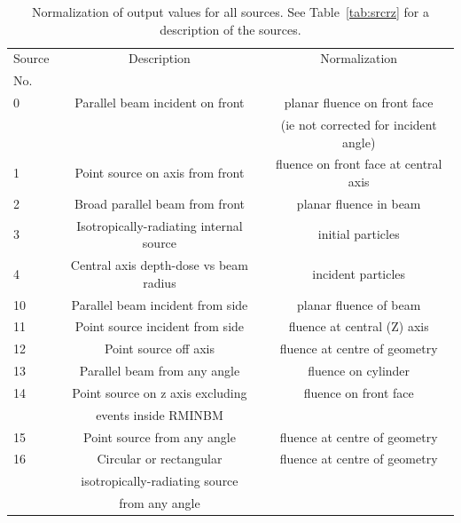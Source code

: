 \documentclass[12pt,twoside]{article}  %
\begin{document}
\begin{htmlonly}
\begin{table}[htb]
\begin{tabular}{|lcc|}
\caption[Normalization for all available sources.]
{Normalization of output values for all sources.  See Table~\ref{tab:srcrz}
for a description of the sources.}\\
\hline\hline
Source & Description & Normalization\\
No.  & & \\
\hline
0 & Parallel beam incident on front & planar fluence on front face \\
  &                                   & (ie not corrected for incident angle)\\
\hline
1 & Point source on axis from front & fluence on front face at central axis\\
\hline
2 & Broad parallel beam from front & planar fluence in beam\\
\hline
3 & Isotropically-radiating internal source & initial particles\\
\hline
4 & Central axis depth-dose vs beam radius & incident particles\\
\hline
10 & Parallel beam incident from side & planar fluence of beam\\
\hline
11 & Point source incident from side & fluence at  central (Z) axis\\
\hline
12 & Point source off axis & fluence at centre of geometry\\
\hline
13 & Parallel beam from any angle & fluence on cylinder\\
\hline
14 & Point source on z axis excluding & fluence on front face\\
   & events inside RMINBM                 & \\
\hline
15 & Point source from any angle & fluence at centre of geometry\\
\hline
16 & Circular or rectangular & fluence at centre of geometry\\
   & isotropically-radiating source & \\
   & from any angle  &\\

\end{tabular}
\end{table}
\end{htmlonly}
\end{document}
